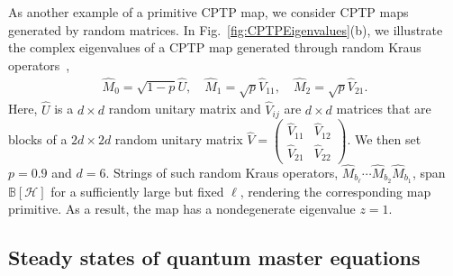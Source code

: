 \documentclass[preprint,pteplogo]{ptephy_v2}%
\numberwithin{equation}{section}
\theoremstyle{definition}
\newcommand{\mc}[1]{\mathcal{#1}}
\newcommand{\mbb}[1]{\mathbb{#1}}
\begin{document}
As another example of a primitive CPTP map, we consider CPTP maps generated by random matrices.
In Fig.~\ref{fig:CPTPEigenvalues}(b), we illustrate the complex eigenvalues of a CPTP map generated through random Kraus operators~\cite{bruzda2009random, sa2020spectral},
\begin{align}
\hat{M}_0 = \sqrt{1-p} \hat{U}, \quad
\hat{M}_1 = \sqrt{p} \hat{V}_{11}, \quad
\hat{M}_2 = \sqrt{p} \hat{V}_{21}.
\end{align}
Here, $\hat{U}$ is a $d \times d$ random unitary matrix and $\hat{V}_{ij}$ are $d \times d$ matrices that are blocks of a $2d \times 2d$ random unitary matrix $\hat{V} = \begin{pmatrix} \hat{V}_{11} & \hat{V}_{12} \\ \hat{V}_{21} & \hat{V}_{22} \end{pmatrix}$.
We then set $p=0.9$ and $d=6$.
Strings of such random Kraus operators, $\hat{M}_{b_\ell} \cdots \hat{M}_{b_2} \hat{M}_{b_1}$, span $\mbb{B}[\mc{H}]$ for a sufficiently large but fixed $\ell$, rendering the corresponding map primitive. 
As a result, the map has a nondegenerate eigenvalue $z=1$.


\subsection{Steady states of quantum master equations}
\label{sec:SteadyStateGKSL}
\end{document}
